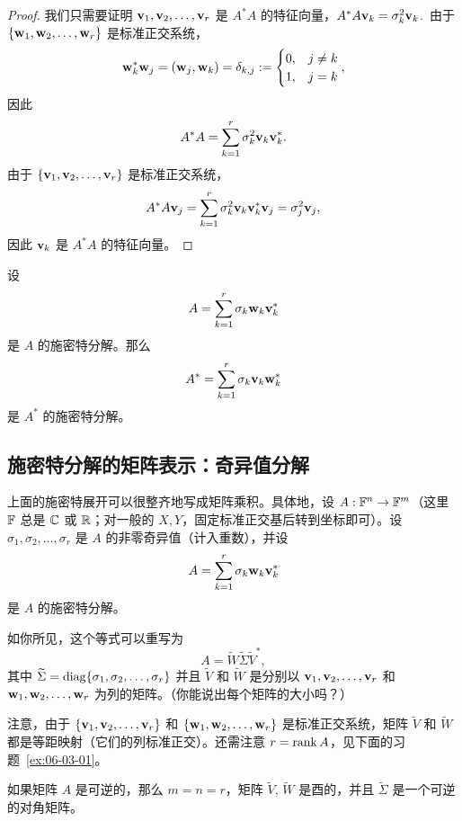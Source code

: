 \begin{proof}我们只需要证明 $\mathbf{v}_1, \mathbf{v}_2, \dots, \mathbf{v}_r$ 是 $A^*A$ 的特征向量，$A^*A\mathbf{v}_k = \sigma_k^2 \mathbf{v}_k$.~由于 $\{\mathbf{w}_1, \mathbf{w}_2, \dots, \mathbf{w}_r\}$ 是标准正交系统，$$\mathbf{w}_k^* \mathbf{w}_j = (\mathbf{w}_j, \mathbf{w}_k) = \delta_{k,j} := \begin{cases} 0, & j \neq k \\ 1, & j = k \end{cases},$$
因此
$$A^*A = \sum_{k=1}^r \sigma_k^2 \mathbf{v}_k \mathbf{v}_k^*.$$
由于 $\{\mathbf{v}_1, \mathbf{v}_2, \dots, \mathbf{v}_r\}$ 是标准正交系统，
$$A^*A\mathbf{v}_j = \sum_{k=1}^r \sigma_k^2 \mathbf{v}_k \mathbf{v}_k^* \mathbf{v}_j = \sigma_j^2 \mathbf{v}_j,$$
因此 $\mathbf{v}_k$ 是 $A^*A$ 的特征向量。\end{proof}

\begin{corollary}\label{stmt:06-03-08}
设 $$A = \sum_{k=1}^r \sigma_k \mathbf{w}_k \mathbf{v}_k^*$$
是 $A$ 的施密特分解。那么
$$A^* = \sum_{k=1}^r \sigma_k \mathbf{v}_k \mathbf{w}_k^*$$
是 $A^*$ 的施密特分解。
\end{corollary}

\subsection{施密特分解的矩阵表示：奇异值分解}\label{sec:06-03-04}

上面的施密特展开可以很整齐地写成矩阵乘积。具体地，设 $A: \mathbb{F}^n \to \mathbb{F}^m$（这里 $\mathbb{F}$ 总是 $\mathbb{C}$ 或 $\mathbb{R}$；对一般的 $X,Y$，固定标准正交基后转到坐标即可）。设 $\sigma_1, \sigma_2, \dots, \sigma_r$ 是 $A$ 的非零奇异值（计入重数），并设
$$A = \sum_{k=1}^r \sigma_k \mathbf{w}_k \mathbf{v}_k^*$$
是 $A$ 的施密特分解。

如你所见，这个等式可以重写为
\begin{equation}\label{eq:06-03-03}
A = \widetilde{W} \widetilde{\Sigma} \widetilde{V}^*,
\end{equation}
其中 $\widetilde{\Sigma} = \operatorname{diag}\{\sigma_1, \sigma_2, \dots, \sigma_r\}$ 并且 $\widetilde{V}$ 和 $\widetilde{W}$ 是分别以 $\mathbf{v}_1, \mathbf{v}_2, \dots, \mathbf{v}_r$ 和 $\mathbf{w}_1, \mathbf{w}_2, \dots, \mathbf{w}_r$ 为列的矩阵。（你能说出每个矩阵的大小吗？）

注意，由于 $\{\mathbf{v}_1, \mathbf{v}_2, \dots, \mathbf{v}_r\}$ 和 $\{\mathbf{w}_1, \mathbf{w}_2, \dots, \mathbf{w}_r\}$ 是标准正交系统，矩阵 $\widetilde{V}$ 和 $\widetilde{W}$ 都是等距映射（它们的列标准正交）。还需注意 $r = \operatorname{rank} A$，见下面的习题~\ref{ex:06-03-01}。

如果矩阵 $A$ 是可逆的，那么 $m=n=r$，矩阵 $\widetilde{V}$, $\widetilde{W}$ 是酉的，并且 $\widetilde{\Sigma}$ 是一个可逆的对角矩阵。

